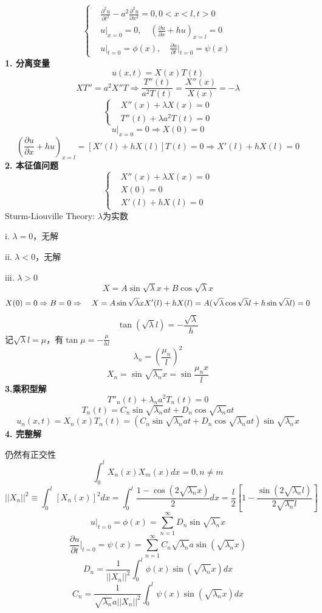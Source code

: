 \begin{ex}
    $$\left\{
        \begin{aligned}
        &\frac{\partial^2{u}}{\partial{t}^2}-a^2\frac{\partial^2{u}}{\partial{x}^2}=0,0<x<l,t>0\\
        &u|_{x=0}=0,\quad\left(\frac{\partial u}{\partial x}+hu\right)_{x=l}=0\\
        &u|_{t=0}=\phi(x),
        \quad\frac{\partial u}{\partial t}\bigg|_{t=0}=\psi(x)
                \end{aligned}
        \right.$$
\noindent\textbf{1. 分离变量}
            $$u(x,t)=X(x)T(t)$$
            $$XT''=a^2X''T\Rightarrow\frac{T''(t)}{a^2 T(t)}=\frac{X''(x)}{X(x)}=-\lambda$$
            $$\left\{
        \begin{aligned}
        &X''(x)+\lambda X(x)=0\\
        &T''(t)+\lambda a^2T(t)=0
                \end{aligned}
        \right.$$
            $$u|_{x=0}=0\Rightarrow X(0)=0$$
            $$\left(\frac{\partial u}{\partial x}+hu\right)_{x=l}=[X'(l)+hX(l)]T(t)=0\Rightarrow X'(l)+hX(l)=0$$
\noindent\textbf{2. 本征值问题}
            $$\left\{
        \begin{aligned}
        &X''(x)+\lambda X(x)=0\\
        &X(0)=0\\
        &X'(l)+hX(l)=0
                \end{aligned}
        \right.$$
            Sturm-Liouville Theory: $\lambda$为实数

            \noindent i. $\lambda=0$，无解

            \noindent ii. $\lambda<0$，无解

            \noindent iii. $\lambda>0$
            $$X=A\sin{\sqrt{\lambda}x}+B\cos{\sqrt{\lambda}x}$$
            $$X(0)=0\Rightarrow B=0\Rightarrow \quad X=A\sin{\sqrt{\lambda}x}\\ X'(l)+hX(l)=A(\sqrt{\lambda}\cos\sqrt{\lambda}l+h\sin\sqrt{\lambda}l)=0$$
            $$\tan(\sqrt{\lambda}l)=-\frac{\sqrt{\lambda}}{h}$$
              记$\sqrt{\lambda}l=\mu$，有$\tan\mu=-\frac{\mu}{hl}$
              $$\lambda_n=\left(\frac{\mu_n}{l}\right)^2$$
              $$X_n=\sin{\sqrt{\lambda_n}x}=\sin{\frac{\mu_nx}{l}}$$
\noindent\textbf{3.乘积型解}
            $$T''_n(t)+\lambda_na^2T_n(t)=0$$
            $$T_n(t)=C_n\sin\sqrt{\lambda_n}at+D_n\cos\sqrt{\lambda_n}at$$
            $$u_n(x,t)=X_n(x)T_n(t)=\left(C_n\sin\sqrt{\lambda_n}at+D_n\cos\sqrt{\lambda_n}at\right)\sin{\sqrt{\lambda_n}x}$$
\noindent\textbf{4. 完整解}

          仍然有正交性$$\int_0^lX_n(x)X_m(x)dx=0,n\ne m$$
        $$||X_n||^2\equiv\int_0^l[X_n(x)]^2dx=\int_0^l\frac{1-\cos(2\sqrt{\lambda_n}x)}{2}dx=\frac{l}{2}\left[1-\frac{\sin(2\sqrt{\lambda_n}l)}{2\sqrt{\lambda_n}l}\right]$$
          $$u|_{t=0}=\phi(x)=\sum_{n=1}^\infty D_n\sin{\sqrt{\lambda_n}x}$$
          $$\frac{\partial u}{\partial t}\bigg|_{t=0}=\psi(x)=\sum_{n=1}^\infty C_n\sqrt{\lambda_n}a\sin(\sqrt{\lambda_n}x)$$
        $$D_n=\frac{1}{||X_n||^2}\int_0^l\phi(x)\sin(\sqrt{\lambda_n}x)dx$$
        $$C_n=\frac{1}{\sqrt{\lambda_n}a||X_n||^2}\int_0^l\psi(x)\sin(\sqrt{\lambda_n}x)dx$$
\end{ex}

